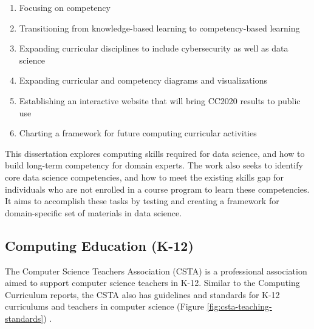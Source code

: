 \documentclass[010-intro.tex]{subfiles}
\begin{document}
    \begin{enumerate}
        \item Focusing on competency
        \item Transitioning from knowledge-based learning to competency-based learning
        \item Expanding curricular disciplines to include cybersecurity as well as data science
        \item Expanding curricular and competency diagrams and visualizations
        \item Establishing an interactive website that will bring CC2020 results to public use
        \item Charting a framework for future computing curricular activities
    \end{enumerate}

    This dissertation explores computing skills required for data science,
    and how to build long-term competency for domain experts.
    The work also seeks to identify core data science competencies,
    and how to meet the existing skills gap for individuals who are not enrolled
    in a course program to learn these competencies.
    It aims to accomplish these tasks by
    testing and creating a framework for domain-specific set of materials in data science.

\subsection{Computing Education (K-12)}

    The Computer Science Teachers Association (CSTA)
    is a professional association aimed to support computer science teachers in K-12.
    Similar to the Computing Curriculum reports,
    the CSTA also has guidelines and standards for K-12 curriculums and teachers in computer science
    (Figure \ref{fig:csta-teaching-standards}) \cite{csta2017}.
\end{document}
